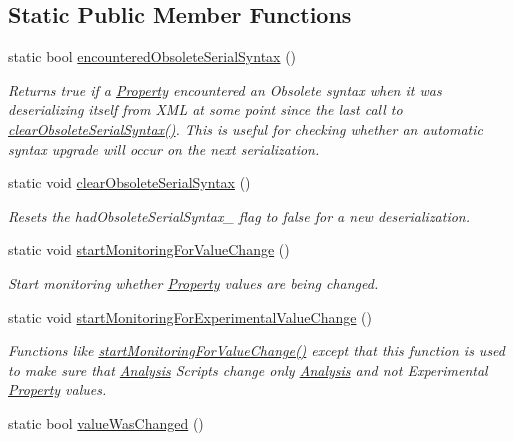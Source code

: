 \subsection*{Static Public Member Functions}
\begin{DoxyCompactItemize}
\item 
\hypertarget{class_picto_1_1_property_aa8cc1b6113b78ef2679adae457dac24d}{static bool \hyperlink{class_picto_1_1_property_aa8cc1b6113b78ef2679adae457dac24d}{encountered\-Obsolete\-Serial\-Syntax} ()}\label{class_picto_1_1_property_aa8cc1b6113b78ef2679adae457dac24d}

\begin{DoxyCompactList}\small\item\em Returns true if a \hyperlink{class_picto_1_1_property}{Property} encountered an Obsolete syntax when it was deserializing itself from X\-M\-L at some point since the last call to \hyperlink{class_picto_1_1_property_a934565d6d21c8600a79ff7d5150a54e2}{clear\-Obsolete\-Serial\-Syntax()}. This is useful for checking whether an automatic syntax upgrade will occur on the next serialization. \end{DoxyCompactList}\item 
static void \hyperlink{class_picto_1_1_property_a934565d6d21c8600a79ff7d5150a54e2}{clear\-Obsolete\-Serial\-Syntax} ()
\begin{DoxyCompactList}\small\item\em Resets the had\-Obsolete\-Serial\-Syntax\-\_\- flag to false for a new deserialization. \end{DoxyCompactList}\item 
static void \hyperlink{class_picto_1_1_property_a59b424f90e965db678b0fe4f8702eb5d}{start\-Monitoring\-For\-Value\-Change} ()
\begin{DoxyCompactList}\small\item\em Start monitoring whether \hyperlink{class_picto_1_1_property}{Property} values are being changed. \end{DoxyCompactList}\item 
static void \hyperlink{class_picto_1_1_property_a2421feb1da0092567df8dd7bf1e2ea89}{start\-Monitoring\-For\-Experimental\-Value\-Change} ()
\begin{DoxyCompactList}\small\item\em Functions like \hyperlink{class_picto_1_1_property_a59b424f90e965db678b0fe4f8702eb5d}{start\-Monitoring\-For\-Value\-Change()} except that this function is used to make sure that \hyperlink{class_picto_1_1_analysis}{Analysis} Scripts change only \hyperlink{class_picto_1_1_analysis}{Analysis} and not Experimental \hyperlink{class_picto_1_1_property}{Property} values. \end{DoxyCompactList}\item 
\hypertarget{class_picto_1_1_property_a3cc79cb85c80f026ea93418617b8aa57}{static bool \hyperlink{class_picto_1_1_property_a3cc79cb85c80f026ea93418617b8aa57}{value\-Was\-Changed} ()}\label{class_picto_1_1_property_a3cc79cb85c80f026ea93418617b8aa57}


\end{DoxyCompactItemize}
